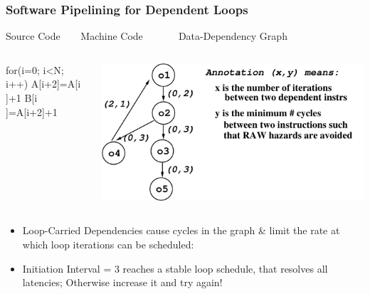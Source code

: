 \documentclass{beamer}
\begin{document}
\begin{frame}[fragile,t]
    \frametitle{Software Pipelining for Dependent Loops}

\begin{block}{Source Code{\tt~~~~}Machine Code{\tt~~~~~~~}Data-Dependency Graph}
\begin{columns}
\begin{colorcode}[fontsize=\tiny]
for(i=0; i<N; i++)
  A[i+2]=A[i  ]+1
  B[i  ]=A[i+2]+1
\end{colorcode}
\includegraphics[width=27ex]{Figures/SftPipeDepGraph}
\end{columns}
\end{block}

\bigskip

\begin{scriptsize}
\begin{itemize}
    \item Loop-Carried Dependencies cause cycles in the graph \& limit the rate 
            at which loop iterations can be scheduled:
            \begin{itemize}
            \end{itemize}
    \item Initiation Interval = 3 reaches a stable loop schedule,
            that resolves all latencies; Otherwise increase it and try again!
\end  {itemize}
\end{scriptsize}
\end{frame}
\end{document}
